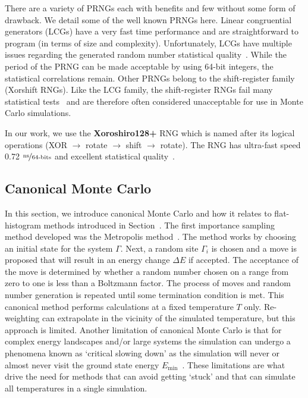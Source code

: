 There are a variety of PRNGs each with benefits and few without some form of
drawback. We detail some of the well known PRNGs here. Linear congruential
generators (LCGs) have a very fast time performance and are straightforward to
program (in terms of size and complexity). Unfortunately, LCGs have multiple
issues regarding the generated random number statistical
quality~\cite{coddington1994analysis, barry1996recommendations}. While the
period of the PRNG can be made acceptable by using 64-bit integers, the
statistical correlations remain. Other PRNGs belong to the
shift-register family (Xorshift RNGs). Like the LCG family, the shift-register
RNGs fail many statistical tests~\cite{panneton2005xorshift} and are therefore
often considered unacceptable for use in Monte Carlo simulations.

In our work, we use the \textbf{Xoroshiro128+} RNG which is named after its logical operations (XOR $\xrightarrow{}$ rotate $\xrightarrow{}$ shift $\xrightarrow{}$ rotate). The RNG has ultra-fast speed 0.72 $\nicefrac{\text{ns}}{\text{64-bits}}$ and excellent statistical quality~\cite{blackman2018scrambled}.

\subsection{Canonical Monte Carlo}\label{cmc}
In this section, we introduce canonical Monte Carlo and how it relates to flat-histogram methods introduced in Section~. The first importance sampling method developed was the Metropolis method~\cite{metropolis1953equation}.  The method works by choosing an initial state for the system $\Gamma$. Next, a random site $\Gamma_i$ is chosen and a move is proposed that will result in an energy change $\Delta E$ if accepted. The acceptance of the move is determined by whether a random number chosen on a range from zero to one is less than a Boltzmann factor. The process of moves and random number generation is repeated until some termination condition is met. This canonical method performs calculations at a fixed temperature $T$ only. Re-weighting can extrapolate in the vicinity of the simulated temperature, but this approach is limited. Another limitation of canonical Monte Carlo is that for complex energy landscapes and/or large systems the simulation can undergo a phenomena known as `critical slowing down' as the simulation will never or almost never visit the ground state energy $E_{\min}$~\cite{berg2000introduction}. These limitations are what drive the need for methods that can avoid getting `stuck' and that can simulate all temperatures in a single simulation.

